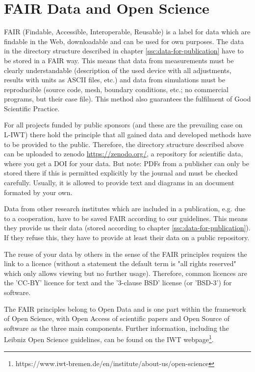 \section{FAIR Data and Open Science}\label{ssc:FAIR-Data}

FAIR (Findable, Accessible, Interoperable, Reusable) is a label for data which are findable in the Web, downloadable and can be used for own purposes. The data in the directory structure described in chapter \ref{ssc:data-for-publication} have to be stored in a FAIR way. This means that data from measurements must be clearly understandable (description of the used device with all adjustments, results with units as ASCII files, etc.) and data from simulations must be reproducible (source code, mesh, boundary conditions, etc.; no commercial programs, but their case file). This method also guarantees the fulfilment of Good Scientific Practice.

For all projects funded by public sponsors (and these are the prevailing case on L-IWT) there hold the principle that all gained data and developed methods have to be provided to the public. Therefore, the directory structure described above can be uploaded to zenodo \url{https://zenodo.org/}, a repository for scientific data, where you get a DOI for your data. But note: PDFs from a publisher can only be stored there if this is permitted explicitly by the journal and must be checked carefully. Usually, it is allowed to provide text and diagrams in an document formated by your own.

Data from other research institutes which are included in a publication, e.g. due to a cooperation, have to be saved FAIR according to our guidelines. This means they provide us their data (stored according to chapter  \ref{ssc:data-for-publication}). If they refuse this, they have to provide at least their data on a public repository.

The reuse of your data by others in the sense of the FAIR principles requires the link to a licence (without a statement the default term is "all rights reserved" which only allows viewing but no further usage).
Therefore, common licences are the 'CC-BY' licence for text and  the '3-clause BSD' license (or 'BSD-3') for software.

The FAIR principles belong to Open Data and is one part within the framework of Open Science, with Open Access of scientific papers and Open Source of software as the three main components. Further information, including the Leibniz Open Science guidelines, can be found on the IWT webpage\footnote{https://www.iwt-bremen.de/en/institute/about-us/open-science}.
